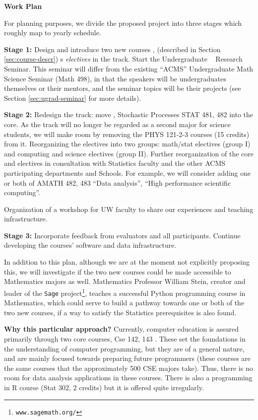 {\bf Work Plan}

For planning purposes, we divide the proposed project into three stages which
roughly map to yearly schedule. 

{\bf Stage 1:} Design and introduce two new courses \statcl, \astrocl
(described in Section \ref{sec:course-descr}) s {\em electives} in the
track.  Start the Undergraduate \cdse~ Research Seminar. This seminar
will differ from the existing ``ACMS'' Undergraduate Math Science
Seminar ({\sc Math 498}), in that the speakers will be undergraduates
themselves or their mentors, and the seminar topics will be their
projects (see Section \ref{sec:ugrad-seminar} for more details).

{\bf Stage 2:} Redesign the track: move \statcl, Stochastic Processes {\sc STAT 481, 482} into the core. As the track will no longer be regarded as a second major for science students, we will make room by removing the {\sc PHYS 121-2-3} courses (15 credits) from it.  Reorganizing the electives into two groups: math/stat electives (group I) and computing and science electives (group II). Further reorganization of the core and electives in consultation with Statistics faculty and the other ACMS participating departments and Schools. For example, we will consider adding one or both of {\sc AMATH 482, 483} ``Data analysis'', ``High performance scientific computing''.

Organization of a workshop for UW faculty to share our experiences and teaching infrastructure.

{\bf Stage 3:} Incorporate feedback from evaluators and all participants. Continue developing the courses' software and data infrastructure. 

In addition to this plan, although we are at the moment not explicitly
proposing this, we will investigate if the two new courses could be
made accessible to Mathematics majors as well. Mathematics Professor
William Stein, creator and leader of the {\tt Sage}
project\footnote{{\tt www.sagemath.org/}}, teaches a successful Python
programming course in Mathematics, which could serve to build a
pathway towards one or both of the two new courses, if a way to
satisfy the Statistics prerequisites is also found.


{\bf Why this particular approach?} Currently, computer education is
assured primarily through two core courses, {\sc Cse 142, 143}
\cite{cse142,Reges:java}. These set the foundations in the understanding of
computer programming, but they are of a general nature, and are mainly
focused towards preparing future programmers  (these courses are the
same courses that the approximately 500 CSE majors take). Thus, there
is no room for data analysis applications in these courses.  There is
also a programming in R course ({\sc Stat 302}, 2 credits) but it is 
offered quite irregularly.

